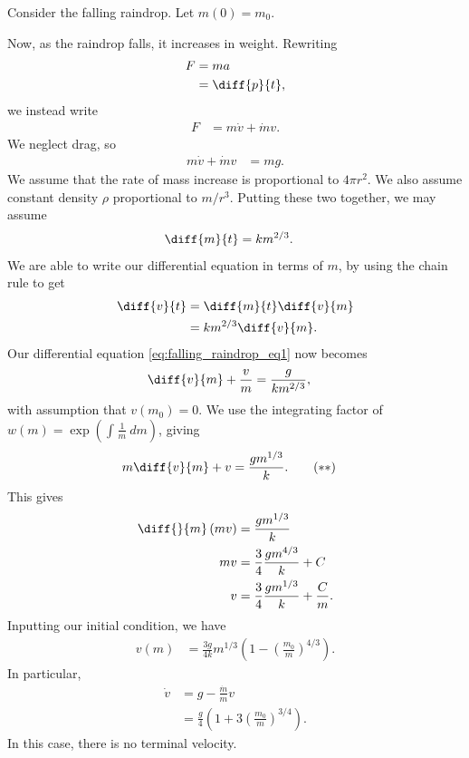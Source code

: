 \documentclass[10pt]{mypackage}
\begin{document}
  \begin{example}
    Consider the falling raindrop. Let $m(0) = m_0$.\newline

    Now, as the raindrop falls, it increases in weight. Rewriting
    \begin{align*}
      F &= ma\\
        &= \diff{p}{t},
    \end{align*}
    we instead write
    \begin{align*}
      F &= m \dot{v} + \dot{m} v.\label{eq:falling_raindrop_eq1}\tag{$\ast$}
    \end{align*}
    We neglect drag, so
    \begin{align*}
      m\dot{v} + \dot{m}v &= mg.
    \end{align*}
    We assume that the rate of mass increase is proportional to $4\pi r^2$. We also assume constant density $\rho$ proportional to $m/r^3$. Putting these two together, we may assume
    \begin{align*}
      \diff{m}{t} &= k m^{2/3}.
    \end{align*}
    We are able to write our differential equation in terms of $m$, by using the chain rule to get
    \begin{align*}
      \diff{v}{t} &= \diff{m}{t} \diff{v}{m}\\
                  &= km^{2/3} \diff{v}{m}.
    \end{align*}
    Our differential equation \eqref{eq:falling_raindrop_eq1} now becomes
    \begin{align*}
      \diff{v}{m} + \frac{v}{m} &= \frac{g}{km^{2/3}},
    \end{align*}
    with assumption that $v\left( m_0 \right) = 0$. We use the integrating factor of $w(m) = \exp\left( \int_{}^{} \frac{1}{m}\:dm \right)$, giving
    \begin{align*}
      m \diff{v}{m} + v &= \frac{gm^{1/3}}{k}.\label{eq:falling_raindrop_eq2}\tag{$\ast\ast$}
    \end{align*}
    This gives
    \begin{align*}
      \diff{}{m}\left( mv \right) &= \frac{gm^{1/3}}{k}\\
      mv &= \frac{3}{4}\frac{gm^{4/3}}{k} + C\\
      v &= \frac{3}{4}\frac{gm^{1/3}}{k} + \frac{C}{m}.
    \end{align*}
    Inputting our initial condition, we have
    \begin{align*}
      v(m) &= \frac{3g}{4k}m^{1/3}\left( 1-\left( \frac{m_0}{m} \right)^{4/3} \right).
    \end{align*}
    In particular,
    \begin{align*}
      \dot{v} &= g-  \frac{\dot{m}}{m}v\\
              &= \frac{g}{4}\left( 1 + 3\left( \frac{m_0}{m} \right)^{3/4} \right).
    \end{align*}
    In this case, there is no terminal velocity.
  \end{example}
\end{document}
